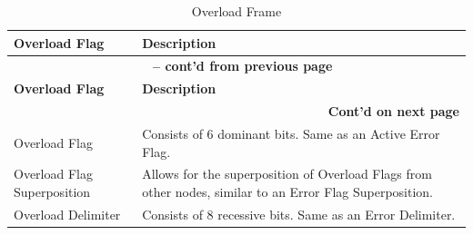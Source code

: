 \begin{longtable}[c]{|p{4.5cm}|p{12cm}|} 
    
  \caption{Overload Frame}
  \label{tab:twai-overload-frame} 
  \\\hline
  \rowcolor{lightgray}
  \textbf{Overload Flag} & \textbf{Description}
  \\\hline
  \endfirsthead
  
  \multicolumn{2}{c}{\bfseries \tablename\ \thetable{} -- cont'd from previous page}\\  \hline
  
  \rowcolor{lightgray}
    \textbf{Overload Flag} & \textbf{Description}
  \\\hline
  \endhead
  
  \multicolumn{2}{r}{\textbf{Cont'd on next page}} \\
  \endfoot
  \endlastfoot
  
    Overload Flag & Consists of 6 dominant bits. Same as an Active Error Flag.
          \\\hline
    Overload Flag Superposition & Allows for the superposition of Overload Flags from other nodes, similar to an Error Flag Superposition.
           \\\hline
    Overload Delimiter & Consists of 8 recessive bits. Same as an Error Delimiter.              \\\hline
\end{longtable}
